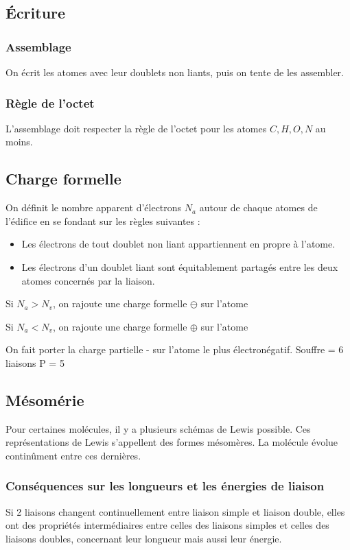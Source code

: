 \documentclass[french]{yLectureNote}
\begin{document}
\subsection{Écriture}
\subsubsection{Assemblage}
On écrit les atomes avec leur doublets non liants, puis on tente de les assembler.
\subsubsection{Règle de l'octet}
L'assemblage doit respecter la règle de l'octet pour les atomes $C,H,O,N$ au moins.


\subsection{Charge formelle}
On définit le nombre apparent d’électrons $N_a$ autour de chaque atomes de l’édifice en se fondant sur les règles suivantes :
\begin{itemize}
 \item Les électrons de tout doublet non liant appartiennent en propre
à l’atome.
\item Les électrons d’un doublet liant sont équitablement partagés
entre les deux atomes concernés par la liaison.
\end{itemize}
Si $N_a > N_v$, on rajoute une charge formelle $\ominus$ sur l'atome

Si $N_a < N_v$, on rajoute une charge formelle $\oplus$ sur l'atome

On fait porter la charge partielle - sur l'atome le plus électronégatif.
Souffre  = 6 liaisons
P = 5
\subsection{Mésomérie}
Pour certaines molécules, il y a plusieurs schémas de Lewis possible. Ces représentations de Lewis s'appellent des formes mésomères. La molécule évolue contin\^ument entre ces dernières.

\subsubsection{Conséquences sur les longueurs et les énergies de liaison}
Si 2 liaisons changent continuellement entre liaison simple et liaison double, elles ont des propriétés intermédiaires entre celles des liaisons simples et celles des liaisons doubles, concernant leur longueur mais aussi leur énergie.
\end{document}
